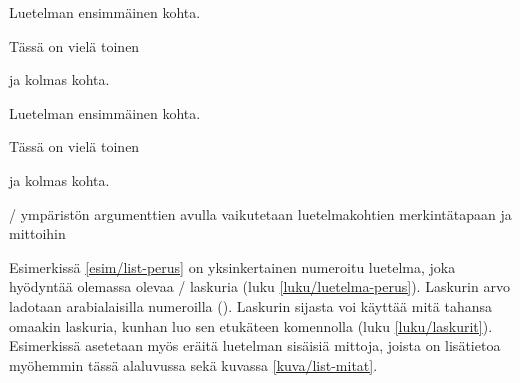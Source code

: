 \begin{esimerkki*}

\begin{koodilohko}
\begin{list}{)}{
    \setlength{\leftmargin}{1.5em} %
    \setlength{\itemsep}{.2ex}     %
    \setlength{\parsep}{0ex}       %
  }
\item Luetelman ensimmäinen kohta.
\item Tässä on vielä toinen
\item ja kolmas kohta.
\end{list}
\end{koodilohko}
  \begin{tulos}
    \begin{list}{)}{
        \setlength{\leftmargin}{1.5em} %
        \setlength{\itemsep}{.2ex}     %
        \setlength{\parsep}{0ex}       %
      }
    \item Luetelman ensimmäinen kohta.
    \item Tässä on vielä toinen
    \item ja kolmas kohta.
    \end{list}
  \end{tulos}
  \caption{\-/ ympäristön argumenttien avulla vaikutetaan
    luetelmakohtien merkintätapaan ja mittoihin}
  \label{esim/list-perus}
\end{esimerkki*}

Esimerkissä \ref{esim/list-perus} on yksinkertainen numeroitu luetelma,
joka hyödyntää olemassa olevaa \-/ laskuria (luku
\ref{luku/luetelma-perus}). Laskurin arvo ladotaan arabialaisilla
numeroilla (). Laskurin  sijasta voi
käyttää mitä tahansa omaakin laskuria, kunhan luo sen etukäteen
komennolla  (luku \ref{luku/laskurit}). Esimerkissä
asetetaan myös eräitä luetelman sisäisiä mittoja, joista on lisätietoa
myöhemmin tässä alaluvussa sekä kuvassa \ref{kuva/list-mitat}.

